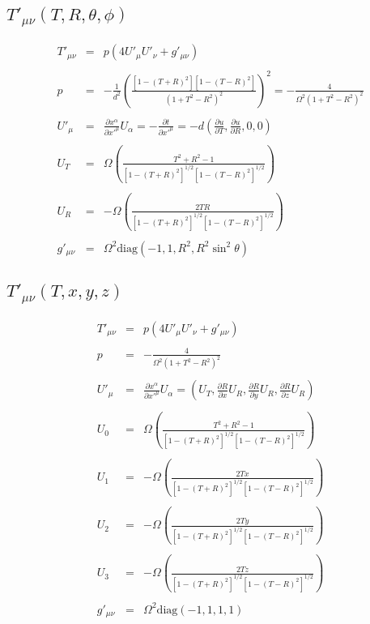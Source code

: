 \documentclass[10pt,letterpaper]{article}
\numberwithin{equation}{section}
\begin{document}
\subsection{$T'_{\mu\nu}(T,R,\theta,\phi)$}
\begin{eqnarray}
T'_{\mu\nu} &=& p(4U'_\mu U'_\nu + g'_{\mu\nu})
\\ \nonumber\\
p &=& -\frac{1}{d^2} \left( \frac{[1-(T+R)^2][1-(T-R)^2]}{(1+T^2-R^2)^2}\right)^2  = -\frac{4}{\Omega^2(1+T^2-R^2)^2}
\\ \nonumber\\
U'_{\mu} &=& \frac{\partial x^\alpha}{\partial x'^\mu}U_\alpha = - \frac{\partial t}{\partial x'^\mu} 
= -d \left( \frac{\partial u}{\partial T}, \frac{\partial u}{\partial R},0,0\right)
\\ \nonumber\\
U_T &=& \Omega \left(\frac{T^2+R^2-1}{[1-(T+R)^2]^{1/2}[1-(T-R)^2]^{1/2}}\right)
\\ \nonumber\\
U_R &=& -\Omega \left(\frac{2TR}{[1-(T+R)^2]^{1/2}[1-(T-R)^2]^{1/2}}\right)
\\ \nonumber\\
g'_{\mu\nu} &=& \Omega^2 \text{diag}\left(-1,1,R^2,R^2\sin^2\theta\right)
\end{eqnarray}
%
%
\subsection{$T'_{\mu\nu}(T,x,y,z)$}
\begin{eqnarray}
T'_{\mu\nu} &=& p(4U'_\mu U'_\nu + g'_{\mu\nu})
\\ \nonumber\\
p &=& -\frac{4}{\Omega^2(1+T^2-R^2)^2}
\\ \nonumber\\
U'_{\mu} &=& \frac{\partial x^\alpha}{\partial x'^\mu}U_\alpha 
= \left( U_T, \frac{\partial R}{\partial x}U_R,\frac{\partial R}{\partial y}U_R,\frac{\partial R}{\partial z}U_R\right)
\\ \nonumber\\
U_0 &=& \Omega \left(\frac{T^2+R^2-1}{[1-(T+R)^2]^{1/2}[1-(T-R)^2]^{1/2}}\right)
\\ \nonumber\\
U_1 &=& -\Omega\left(\frac{2Tx}{[1-(T+R)^2]^{1/2}[1-(T-R)^2]^{1/2}}\right)
\\ \nonumber\\
U_2 &=& -\Omega\left(\frac{2Ty}{[1-(T+R)^2]^{1/2}[1-(T-R)^2]^{1/2}}\right)
\\ \nonumber\\
U_3 &=& -\Omega\left(\frac{2Tz}{[1-(T+R)^2]^{1/2}[1-(T-R)^2]^{1/2}}\right)
\\ \nonumber\\
g'_{\mu\nu} &=& \Omega^2 \text{diag}\left(-1,1,1,1\right)
\end{eqnarray}
%
%
\end{document}
